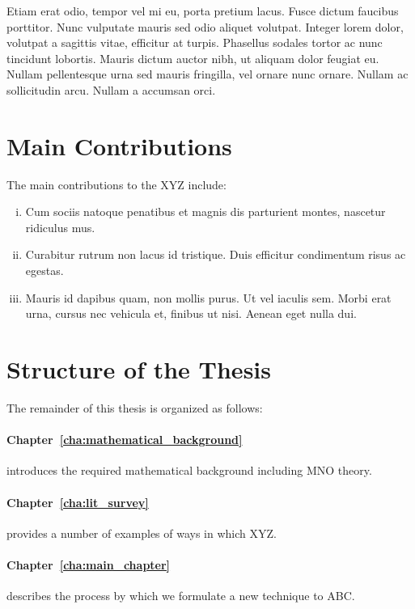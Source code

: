 Etiam erat odio, tempor vel mi eu, porta pretium lacus. Fusce dictum faucibus porttitor. Nunc vulputate mauris sed odio aliquet volutpat. Integer lorem dolor, volutpat a sagittis vitae, efficitur at turpis. Phasellus sodales tortor ac nunc tincidunt lobortis. Mauris dictum auctor nibh, ut aliquam dolor feugiat eu. Nullam pellentesque urna sed mauris fringilla, vel ornare nunc ornare. Nullam ac sollicitudin arcu. Nullam a accumsan orci. \newline


\section{Main Contributions}
\label{sec:main_contributions}

The main contributions to the XYZ include:
\begin{enumerate}[(i)]
	\item Cum sociis natoque penatibus et magnis dis parturient montes, nascetur ridiculus mus. 
	\item Curabitur rutrum non lacus id tristique. Duis efficitur condimentum risus ac egestas.
	\item  Mauris id dapibus quam, non mollis purus. Ut vel iaculis sem. Morbi erat urna, cursus nec vehicula et, finibus ut nisi. Aenean eget nulla dui.
\end{enumerate}


\section{Structure of the Thesis}
\label{sec:structure_of_the_thesis}

The remainder of this thesis is organized as follows:

\paragraph{Chapter~\ref{cha:mathematical_background}} introduces the required mathematical background including MNO theory.

\paragraph{Chapter~\ref{cha:lit_survey}} provides a number of examples of ways in which XYZ. 

\paragraph{Chapter~\ref{cha:main_chapter}} describes the process by which we formulate a new technique to ABC.

